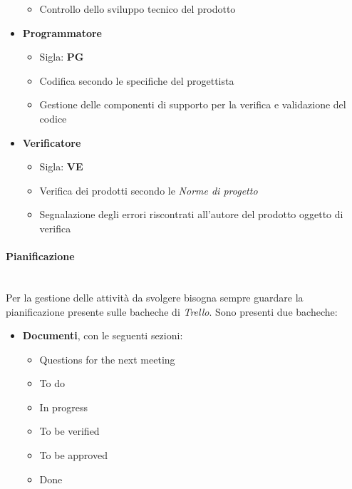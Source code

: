 \begin{itemize}
\begin{itemize}
        \item Controllo dello sviluppo tecnico del prodotto
    \end{itemize}
    \item \textbf{Programmatore}
    \begin{itemize}
        \item Sigla: \textbf{PG}
        \item Codifica secondo le specifiche del progettista
        \item Gestione delle componenti di supporto per la verifica e validazione del codice
    \end{itemize}
    \item \textbf{Verificatore}
    \begin{itemize}
        \item Sigla: \textbf{VE}
        \item Verifica dei prodotti secondo le \textit{Norme di progetto}
        \item Segnalazione degli errori riscontrati all'autore del prodotto oggetto di verifica
    \end{itemize}
\end{itemize}

\paragraph{Pianificazione}
\mbox{}\\
Per la gestione delle attività da svolgere bisogna sempre guardare la pianificazione presente sulle bacheche di \textit{Trello}.
Sono presenti due bacheche:
\begin{itemize}
    \item \textbf{Documenti}, con le seguenti sezioni: 
    \begin{itemize}
        \item Questions for the next meeting
        \item To do
        \item In progress
        \item To be verified
        \item To be approved
        \item Done
    \end{itemize}
\end{itemize}

